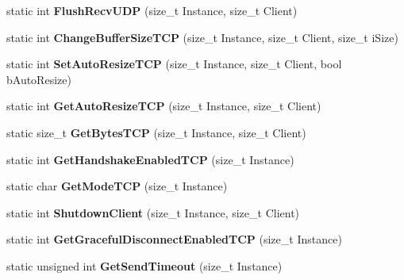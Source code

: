 \begin{DoxyCompactItemize}
\item 
\hypertarget{structmn_c_l_r_ad0b45685df2e052064285fe97fd5aa7d}{
static int {\bfseries FlushRecvUDP} (size\_\-t Instance, size\_\-t Client)}
\label{structmn_c_l_r_ad0b45685df2e052064285fe97fd5aa7d}

\item 
\hypertarget{structmn_c_l_r_a9f08ea5f190150456a8376efa042cbba}{
static int {\bfseries ChangeBufferSizeTCP} (size\_\-t Instance, size\_\-t Client, size\_\-t iSize)}
\label{structmn_c_l_r_a9f08ea5f190150456a8376efa042cbba}

\item 
\hypertarget{structmn_c_l_r_a3e6661888fadf8e80f0e71272f22e91a}{
static int {\bfseries SetAutoResizeTCP} (size\_\-t Instance, size\_\-t Client, bool bAutoResize)}
\label{structmn_c_l_r_a3e6661888fadf8e80f0e71272f22e91a}

\item 
\hypertarget{structmn_c_l_r_aa0fc09b3d31a17f22c43b8a1d9697dfd}{
static int {\bfseries GetAutoResizeTCP} (size\_\-t Instance, size\_\-t Client)}
\label{structmn_c_l_r_aa0fc09b3d31a17f22c43b8a1d9697dfd}

\item 
\hypertarget{structmn_c_l_r_afd7a64f41e13a1242a6c5c3bee391c5b}{
static size\_\-t {\bfseries GetBytesTCP} (size\_\-t Instance, size\_\-t Client)}
\label{structmn_c_l_r_afd7a64f41e13a1242a6c5c3bee391c5b}

\item 
\hypertarget{structmn_c_l_r_a81588ce1c9ab8c8bc9a0ba113371c5b5}{
static int {\bfseries GetHandshakeEnabledTCP} (size\_\-t Instance)}
\label{structmn_c_l_r_a81588ce1c9ab8c8bc9a0ba113371c5b5}

\item 
\hypertarget{structmn_c_l_r_ac9427d6fa5fabe1dcb8b6db5c345a251}{
static char {\bfseries GetModeTCP} (size\_\-t Instance)}
\label{structmn_c_l_r_ac9427d6fa5fabe1dcb8b6db5c345a251}

\item 
\hypertarget{structmn_c_l_r_ac4801af3ef2ceef43129e12e358b1a83}{
static int {\bfseries ShutdownClient} (size\_\-t Instance, size\_\-t Client)}
\label{structmn_c_l_r_ac4801af3ef2ceef43129e12e358b1a83}

\item 
\hypertarget{structmn_c_l_r_a20eb151587f3cd6ef6b7bf8216280988}{
static int {\bfseries GetGracefulDisconnectEnabledTCP} (size\_\-t Instance)}
\label{structmn_c_l_r_a20eb151587f3cd6ef6b7bf8216280988}

\item 
\hypertarget{structmn_c_l_r_ac10b00e2bb70972b76ffefd00ff5a592}{
static unsigned int {\bfseries GetSendTimeout} (size\_\-t Instance)}
\label{structmn_c_l_r_ac10b00e2bb70972b76ffefd00ff5a592}


\end{DoxyCompactItemize}
